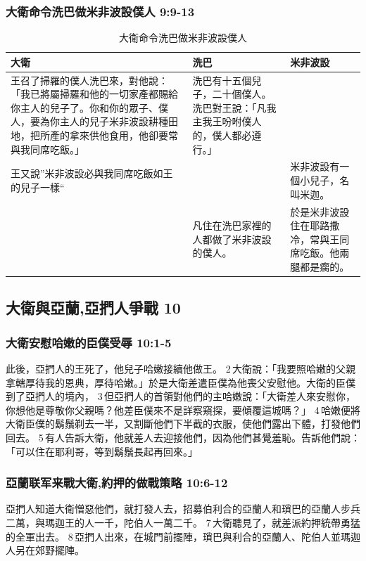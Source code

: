 \subsubsection{大衛命令洗巴做米非波設僕人 9:9-13}
\begin{table}[H]
\hspace*{-7mm}
\centering 
\begin{tabular}{p{}|p{4.5cm}|p{5.25cm}}\hline\hline
大衛&洗巴&米非波設\\\hline
王召了掃羅的僕人洗巴來，對他說：「我已將屬掃羅和他的一切家產都賜給你主人的兒子了。你和你的眾子、僕人，要為你主人的兒子米非波設耕種田地，把所產的拿來供他食用，他卻要常與我同席吃飯。」
&洗巴有十五個兒子，二十個僕人。洗巴對王說：「凡我主我王吩咐僕人的，僕人都必遵行。」&\\\hline
王又說”米非波設必與我同席吃飯如王的兒子一樣“ 
&&米非波設有一個小兒子，名叫米迦。\\\hline
&凡住在洗巴家裡的人都做了米非波設的僕人。&於是米非波設住在耶路撒冷，常與王同席吃飯。他兩腿都是瘸的。\\\hline
\end{tabular}
\caption{大衛命令洗巴做米非波設僕人}
\end{table}

\subsection{大衛與亞蘭,亞捫人爭戰 10}
\subsubsection{大衛安慰哈嫩的臣僕受辱 10:1-5}
此後，亞捫人的王死了，他兒子哈嫩接續他做王。 2 大衛說：「我要照哈嫩的父親拿轄厚待我的恩典，厚待哈嫩。」於是大衛差遣臣僕為他喪父安慰他。大衛的臣僕到了亞捫人的境內， 3 但亞捫人的首領對他們的主哈嫩說：「大衛差人來安慰你，你想他是尊敬你父親嗎？他差臣僕來不是詳察窺探，要傾覆這城嗎？」 4 哈嫩便將大衛臣僕的鬍鬚剃去一半，又割斷他們下半截的衣服，使他們露出下體，打發他們回去。 5 有人告訴大衛，他就差人去迎接他們，因為他們甚覺羞恥。告訴他們說：「可以住在耶利哥，等到鬍鬚長起再回來。」

\subsubsection{亞蘭联军来戰大衛,約押的做戰策略 10:6-12}
亞捫人知道大衛憎惡他們，就打發人去，招募伯利合的亞蘭人和瑣巴的亞蘭人步兵二萬，與瑪迦王的人一千，陀伯人一萬二千。 7 大衛聽見了，就差派約押統帶勇猛的全軍出去。 8 亞捫人出來，在城門前擺陣，瑣巴與利合的亞蘭人、陀伯人並瑪迦人另在郊野擺陣。


